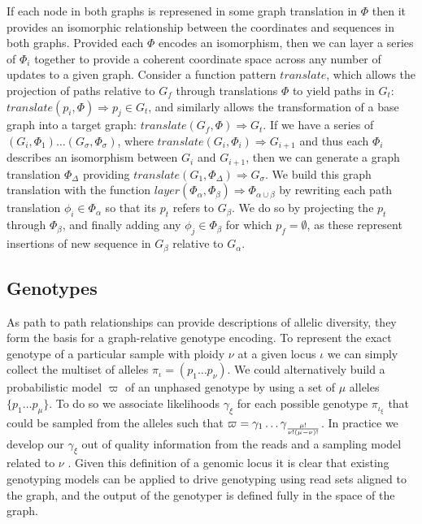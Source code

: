 If each node in both graphs is represened in some graph translation in $\Phi$ then it provides an isomorphic relationship between the coordinates and sequences in both graphs.
Provided each $\Phi$ encodes an isomorphism, then we can layer a series of $\Phi_i$ together to provide a coherent coordinate space across any number of updates to a given graph.
Consider a function pattern $translate$, which allows the projection of paths relative to $G_f$ through translations $\Phi$ to yield paths in $G_t$: $translate(p_i, \Phi) \Rightarrow p_j \in G_t$, and similarly allows the transformation of a base graph into a target graph: $translate(G_f, \Phi) \Rightarrow G_t$.
If we have a series of $(G_i, \Phi_1) \ldots (G_\sigma, \Phi_\sigma)$, where $translate(G_i, \Phi_i) \Rightarrow G_{i+1}$ and thus each $\Phi_i$ describes an isomorphism between $G_i$ and $G_{i+1}$, then we can generate a graph translation $\Phi_\Delta$ providing $translate(G_1, \Phi_\Delta) \Rightarrow G_\sigma$.
We build this graph translation with the function $layer(\Phi_\alpha, \Phi_\beta) \Rightarrow \Phi_{\alpha \cup \beta}$ by rewriting each path translation $\phi_i \in \Phi_\alpha$ so that its $p_t$ refers to $G_\beta$.
We do so by projecting the $p_t$ through $\Phi_\beta$, and finally adding any $\phi_j \in \Phi_\beta$ for which $p_f = \emptyset$, as these represent insertions of new sequence in $G_\beta$ relative to $G_\alpha$.

\subsection{Genotypes}

As path to path relationships can provide descriptions of allelic diversity, they form the basis for a graph-relative genotype encoding.
To represent the exact genotype of a particular sample with ploidy $\nu$ at a given locus $\iota$ we can simply collect the multiset of alleles $\pi_\iota = ( p_1 \ldots p_\nu)$.
We could alternatively build a probabilistic model $\varpi$ of an unphased genotype by using a set of $\mu$ alleles $\{ p_1 \ldots p_\mu\}$.
To do so we associate likelihoods $\gamma_\xi$ for each possible genotype $\pi_{\iota_\xi}$ that could be sampled from the alleles such that $\varpi = \gamma_1 \ldots \gamma_{\mu! \over{\nu!(\mu-\nu)!} }$.
In practice we develop our $\gamma_\xi$ out of quality information from the reads and a sampling model related to $\nu$ \cite{garrison2012haplotype,li2011stats}.
Given this definition of a genomic locus it is clear that existing genotyping models can be applied to drive genotyping using read sets aligned to the graph, and the output of the genotyper is defined fully in the space of the graph.

